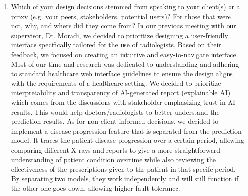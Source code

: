 \documentclass[12pt, titlepage]{article}
\begin{document}
\begin{enumerate}
  \item Which of your design decisions stemmed from speaking to your client(s)
  or a proxy (e.g. your peers, stakeholders, potential users)? For those that
  were not, why, and where did they come from?
  \newline\newline
  In our previous meeting with our supervisor, Dr. Moradi, we decided to prioritize designing a user-friendly interface specifically tailored for the use of radiologists. Based on their feedback, we focused on creating an intuitive and easy-to-navigate interface. Most of our time and research was dedicated to understanding and adhering to standard healthcare web interface guidelines to ensure the design aligns with the requirements of a healthcare setting. We decided to prioritize interpretability and transparency of AI-generated report (explainable AI) which comes from the discussions with stakeholder emphasizing trust in AI results. This would help doctors/radiologists to better understand the prediction results. As for non-client-informed decisions, we decided to implement a disease progression feature that is separated from the prediction model. It traces the patient disease progression over a certain period, allowing comparing different X-rays and reports to give a more straightforward understanding of patient condition overtime while also reviewing the effectiveness of the prescriptions given to the patient in that specifc period. By separating two models, they work independently and will still function if the other one goes down, allowing higher fault tolerance.


\end{enumerate}
\end{document}
